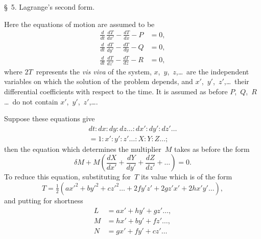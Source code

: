 \documentclass[11pt,a4paper]{article}
\newcommand{\papersection}[1]{\S\ #1.}
\begin{document}
\vspace{10pt}

\papersection{5} Lagrange's second form.

Here the equations of motion are assumed to be
\begin{align*}
\frac{d}{dt}\,\frac{dT}{dx'} - \frac{dT}{dx} - P &= 0,\\
\frac{d}{dt}\,\frac{dT}{dy'} - \frac{dT}{dy} - Q &= 0,\\
\frac{d}{dt}\,\frac{dT}{dz'} - \frac{dT}{dz} - R &= 0,
\end{align*}
where $2T$~represents the \textit{vis viva} of the system, $x$,~$y$,~$z$,\ldots\ are the independent variables on which the solution of the problem depends, and $x'$,~$y'$,~$z'$,\ldots\ their differential coefficients with respect to the time. It is assumed as before $P$,~$Q$,~$R$\ldots\ do not contain $x'$,~$y'$,~$z'$,\ldots.

Suppose these equations give
\begin{multline*}
dt : dx : dy : dz\ldots : dx' : dy' : dz'\ldots \\
= 1 : x' : y' : z'\ldots : X : Y : Z\ldots;
\end{multline*}
then the equation which determines the multiplier~$M$ takes as before the form
\[
\delta M + M\left(\frac{dX}{dx'} + \frac{dY}{dy'} + \frac{dZ}{dz'} + \ldots\right) = 0.
\]
To reduce this equation, substituting for~$T$ its value which is of the form
\[
T = \tfrac{1}{2}(ax'^2 + by'^2 + cz'^2\ldots + 2fy'z' + 2gz'x' + 2hx'y'\ldots),
\]
and putting for shortness
\begin{align*}
L &= ax' + hy' + gz'\ldots,\\
M &= hx' + by' + fz'\ldots,\\
N &= gx' + fy' + cz'\ldots
\end{align*}
\end{document}
